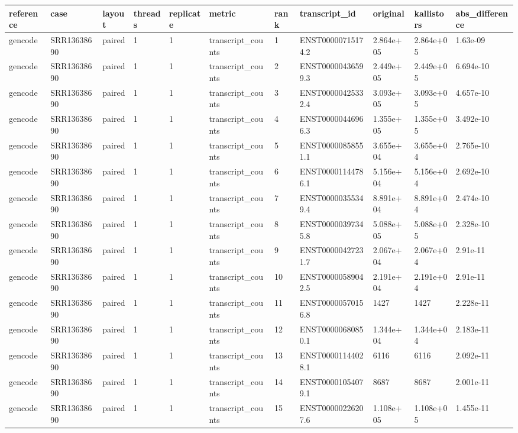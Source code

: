 \begin{tabular}{lllllllllll}
\toprule
reference & case & layout & threads & replicate & metric & rank & transcript\_id & original & kallistors & abs\_difference \\
\midrule
gencode & SRR13638690 & paired & 1 & 1 & transcript\_counts & 1 & ENST00000715174.2 & 2.864e+05 & 2.864e+05 & 1.63e-09 \\
gencode & SRR13638690 & paired & 1 & 1 & transcript\_counts & 2 & ENST00000436599.3 & 2.449e+05 & 2.449e+05 & 6.694e-10 \\
gencode & SRR13638690 & paired & 1 & 1 & transcript\_counts & 3 & ENST00000425332.4 & 3.093e+05 & 3.093e+05 & 4.657e-10 \\
gencode & SRR13638690 & paired & 1 & 1 & transcript\_counts & 4 & ENST00000446966.3 & 1.355e+05 & 1.355e+05 & 3.492e-10 \\
gencode & SRR13638690 & paired & 1 & 1 & transcript\_counts & 5 & ENST00000858551.1 & 3.655e+04 & 3.655e+04 & 2.765e-10 \\
gencode & SRR13638690 & paired & 1 & 1 & transcript\_counts & 6 & ENST00001144786.1 & 5.156e+04 & 5.156e+04 & 2.692e-10 \\
gencode & SRR13638690 & paired & 1 & 1 & transcript\_counts & 7 & ENST00000355349.4 & 8.891e+04 & 8.891e+04 & 2.474e-10 \\
gencode & SRR13638690 & paired & 1 & 1 & transcript\_counts & 8 & ENST00000397345.8 & 5.088e+05 & 5.088e+05 & 2.328e-10 \\
gencode & SRR13638690 & paired & 1 & 1 & transcript\_counts & 9 & ENST00000427231.7 & 2.067e+04 & 2.067e+04 & 2.91e-11 \\
gencode & SRR13638690 & paired & 1 & 1 & transcript\_counts & 10 & ENST00000589042.5 & 2.191e+04 & 2.191e+04 & 2.91e-11 \\
gencode & SRR13638690 & paired & 1 & 1 & transcript\_counts & 11 & ENST00000570156.8 & 1427 & 1427 & 2.228e-11 \\
gencode & SRR13638690 & paired & 1 & 1 & transcript\_counts & 12 & ENST00000680850.1 & 1.344e+04 & 1.344e+04 & 2.183e-11 \\
gencode & SRR13638690 & paired & 1 & 1 & transcript\_counts & 13 & ENST00001144028.1 & 6116 & 6116 & 2.092e-11 \\
gencode & SRR13638690 & paired & 1 & 1 & transcript\_counts & 14 & ENST00001054079.1 & 8687 & 8687 & 2.001e-11 \\
gencode & SRR13638690 & paired & 1 & 1 & transcript\_counts & 15 & ENST00000226207.6 & 1.108e+05 & 1.108e+05 & 1.455e-11 \\

\end{tabular}
